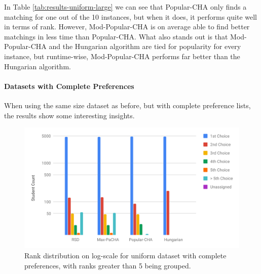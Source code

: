 \begin{table}[h!]
  \centering
  \caption{Average results for the large uniform datasets with incomplete preferences.}
  \label{tab:results-uniform-large}
\end{table}

In Table \ref{tab:results-uniform-large} we can see that Popular-CHA only finds a matching for one out of the 10 instances, but when it does, it performs quite well in terms of rank. However, Mod-Popular-CHA is on average able to find better matchings in less time than Popular-CHA. What also stands out is that Mod-Popular-CHA and the Hungarian algorithm are tied for popularity for every instance, but runtime-wise, Mod-Popular-CHA performs far better than the Hungarian algorithm.

\paragraph{Datasets with Complete Preferences}
When using the same size dataset as before, but with complete preference lists, the results show some interesting insights.

\begin{figure}[h!]
  \centering
    \includegraphics[width=0.75\linewidth]{assets/plots/uniform_compl_distr.pdf}
    \caption{Rank distribution on log-scale for uniform dataset with complete preferences, with ranks greater than 5 being grouped.}
    \label{fig:uniform-complete-distribution}
\end{figure}

